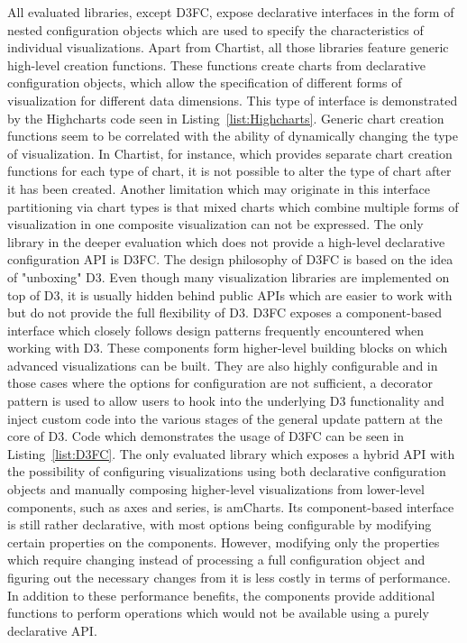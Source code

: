 All evaluated libraries, except D3FC, expose declarative interfaces in
the form of nested configuration objects which are used to specify the
characteristics of individual visualizations.  Apart from Chartist,
all those libraries feature generic high-level creation functions.
These functions create charts from declarative configuration objects,
which allow the specification of different forms of visualization for
different data dimensions.  This type of interface is demonstrated by
the Highcharts code seen in Listing~\ref{list:Highcharts}.  Generic
chart creation functions seem to be correlated with the ability of
dynamically changing the type of visualization.  In Chartist, for
instance, which provides separate chart creation functions for each
type of chart, it is not possible to alter the type of chart after it
has been created.  Another limitation which may originate in this
interface partitioning via chart types is that mixed charts which
combine multiple forms of visualization in one composite visualization
can not be expressed.  The only library in the deeper evaluation which
does not provide a high-level declarative configuration API is D3FC.
The design philosophy of D3FC is based on the idea of "unboxing" D3.
Even though many visualization libraries are implemented on top of D3,
it is usually hidden behind public APIs which are easier to work with
but do not provide the full flexibility of D3.  D3FC exposes a
component-based interface which closely follows design patterns
frequently encountered when working with D3.  These components form
higher-level building blocks on which advanced visualizations can be
built.  They are also highly configurable and in those cases where the
options for configuration are not sufficient, a decorator pattern is
used to allow users to hook into the underlying D3 functionality and
inject custom code into the various stages of the general update
pattern at the core of D3.  Code which demonstrates the usage of D3FC
can be seen in Listing~\ref{list:D3FC}.  The only evaluated library
which exposes a hybrid API with the possibility of configuring
visualizations using both declarative configuration objects and
manually composing higher-level visualizations from lower-level
components, such as axes and series, is amCharts.  Its component-based
interface is still rather declarative, with most options being
configurable by modifying certain properties on the components.
However, modifying only the properties which require changing instead
of processing a full configuration object and figuring out the
necessary changes from it is less costly in terms of performance.  In
addition to these performance benefits, the components provide
additional functions to perform operations which would not be
available using a purely declarative API.



